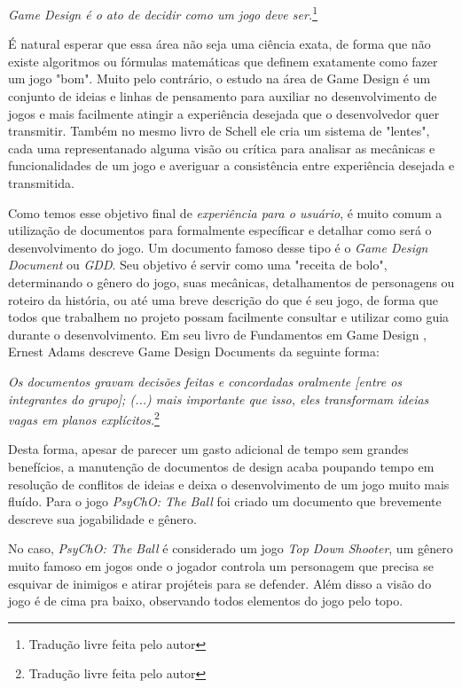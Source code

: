 \begin{displayquote}
  \textit{Game Design é o ato de decidir como um jogo deve ser.}\footnote{Tradução livre feita pelo autor}
\end{displayquote}

É natural esperar que essa área não seja uma ciência exata, de forma que não existe algoritmos ou fórmulas matemáticas que definem exatamente como fazer um jogo "bom". Muito pelo contrário, o estudo na área de Game Design é um conjunto de ideias e linhas de pensamento para auxiliar no desenvolvimento de jogos e mais facilmente atingir a experiência desejada que o desenvolvedor quer transmitir. Também no mesmo livro de Schell \cite{jessegamedesign} ele cria um sistema de "lentes", cada uma representanado alguma visão ou crítica para analisar as mecânicas e funcionalidades de um jogo e averiguar a consistência entre experiência desejada e transmitida.

Como temos esse objetivo final de \textit{experiência para o usuário}, é muito comum a utilização de documentos para formalmente específicar e detalhar como será o desenvolvimento do jogo. Um documento famoso desse tipo é o \textit{Game Design Document} ou \textit{GDD}. Seu objetivo é servir como uma "receita de bolo", determinando o gênero do jogo, suas mecânicas, detalhamentos de personagens ou roteiro da história, ou até uma breve descrição do que é seu jogo, de forma que todos que trabalhem no projeto possam facilmente consultar e utilizar como guia durante o desenvolvimento. Em seu livro de Fundamentos em Game Design \cite{ernestgamedesign}, Ernest Adams descreve Game Design Documents da seguinte forma:

\begin{displayquote}
  \textit{Os documentos gravam decisões feitas e concordadas oralmente [entre os integrantes do grupo]; (...) mais importante que isso, eles transformam ideias vagas em planos explícitos.}\footnote{Tradução livre feita pelo autor}
\end{displayquote}

Desta forma, apesar de parecer um gasto adicional de tempo sem grandes benefícios, a manutenção de documentos de design acaba poupando tempo em resolução de conflitos de ideias e deixa o desenvolvimento de um jogo muito mais fluído. Para o jogo \textit{PsyChO: The Ball} foi criado um documento que brevemente descreve sua jogabilidade e gênero.

No caso, \textit{PsyChO: The Ball} é considerado um jogo \textit{Top Down Shooter}, um gênero muito famoso em jogos onde o jogador controla um personagem que precisa se esquivar de inimigos e atirar projéteis para se defender. Além disso a visão do jogo é de cima pra baixo, observando todos elementos do jogo pelo topo.\\

